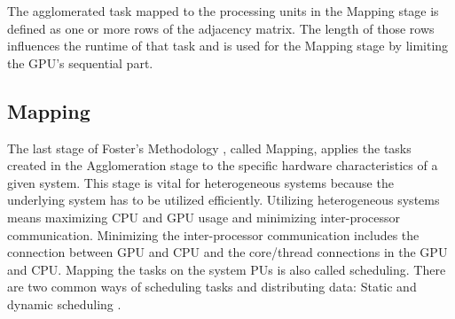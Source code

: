 The agglomerated task mapped to the processing units in the Mapping stage is defined as one or more rows of the adjacency matrix. The length of those rows influences the runtime of that task and is used for the Mapping stage by limiting the GPU's sequential part.

 

\subsection{Mapping}
The last stage of Foster's Methodology \cite{fosterDesigningBuildingParallel1995}, called Mapping, applies the tasks created in the Agglomeration stage to the specific hardware characteristics of a given system. This stage is vital for heterogeneous systems because the underlying system has to be utilized efficiently. Utilizing heterogeneous systems means maximizing CPU and GPU usage and minimizing inter-processor communication. Minimizing the inter-processor communication includes the connection between GPU and CPU and the core/thread connections in the GPU and CPU.
Mapping the tasks on the system PUs is also called scheduling. There are two common ways of scheduling tasks and distributing data: Static and dynamic scheduling \cite{kopetzRealTimeScheduling1997}.

